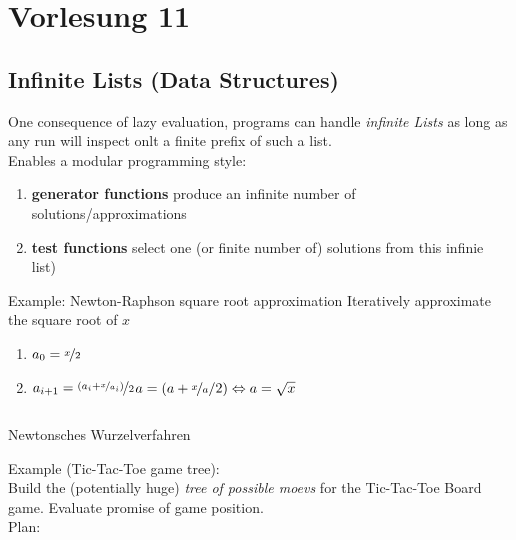 \documentclass{article}
\begin{document}
\section{Vorlesung 11}
\subsection{Infinite Lists (Data Structures)}
One consequence of lazy evaluation, programs can handle \emph{infinite Lists} as long as any run will inspect onlt a finite prefix of such a list.\\
Enables a modular programming style:\\
\begin{enumerate}
\item \textbf{generator functions} produce an infinite number of solutions/approximations
\item \textbf{test functions} select one (or finite number of) solutions from this infinie list)
\end{enumerate}
Example: Newton-Raphson square root approximation
Iteratively approximate the square root of $x$
\begin{enumerate}
\item $a_0 = \nicefrac{x}{2}$
\item $a_{i+1} = \nicefrac{(a_i + \nicefrac{x}{a_i})}{2}$\hfill$a = (a + \nicefrac{x}{a}/2) \Leftrightarrow a = \sqrt{x}$
\end{enumerate}
\begin{listing}
\inputminted{Haskell}{sqrt.hs}
\caption{Newtonsches Wurzelverfahren}
\end{listing}
Example (Tic-Tac-Toe game tree):\\
Build the (potentially huge) \emph{tree of possible moevs} for the Tic-Tac-Toe Board game. Evaluate promise of game position.\\
Plan:\\
\end{document}
